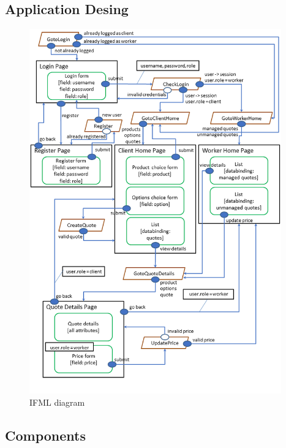 \documentclass[a4paper, 12pt]{article}
\begin{document}
\subsection{Application Desing}
\begin{figure}[h!]
	\centering
	\includegraphics[width=0.97\textwidth]{PureHTML_images/ifml.png}
	\caption{IFML diagram}
	\label{figure:ifml}
\end{figure}
\newpage
\subsection{Components}
\end{document}
